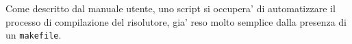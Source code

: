\documentclass{article}
\begin{document}
Come descritto dal manuale utente, uno script si occupera' di automatizzare il processo di compilazione del risolutore, gia' reso molto semplice dalla presenza di un \verb+makefile+.


\end{document}
